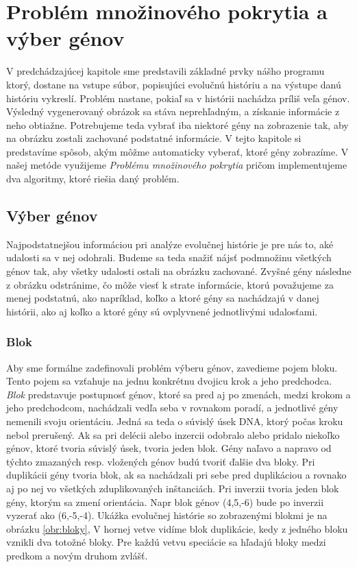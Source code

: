 \chapter{Problém množinového pokrytia a výber génov}
\label{chap:setcover}
V predchádzajúcej kapitole sme predstavili základné prvky nášho programu ktorý, dostane na vstupe súbor, 
popisujúci evolučnú históriu a na výstupe danú históriu vykreslí.
Problém nastane, pokiaľ sa v histórii nachádza príliš veľa génov. Výsledný vygenerovaný obrázok sa stáva neprehľadným, 
a získanie informácie z neho obtiažne. 
Potrebujeme teda vybrať iba niektoré gény na zobrazenie tak, aby na obrázku zostali zachované podstatné informácie.
V tejto kapitole si predstavíme spôsob, akým môžme automaticky vyberať, ktoré gény zobrazíme.
V našej metóde využijeme \emph{Problému množinového pokrytia} pričom implementujeme dva algoritmy, ktoré riešia daný problém.
\section{Výber génov}
Najpodstatnejšou informáciou pri analýze evolučnej histórie je pre nás to, aké udalosti sa v nej odohrali. 
Budeme sa teda snažiť nájsť podmnožinu všetkých génov tak, aby všetky udalosti ostali na obrázku zachované.
Zvyšné gény následne z obrázku odstránime, čo môže viesť k strate informácie, ktorú považujeme za menej podstatnú, 
ako napríklad, koľko a ktoré gény sa nachádzajú v danej histórii, ako aj koľko a ktoré gény sú ovplyvnené jednotlivými udalosťami.
\subsection{Blok}\label{blok}
Aby sme formálne zadefinovali problém výberu génov, zavedieme pojem bloku. Tento pojem sa vzťahuje na jednu konkrétnu dvojicu krok a jeho predchodca.
\emph{Blok} predstavuje postupnosť génov, ktoré sa pred aj po zmenách, medzi krokom a jeho predchodcom, nachádzali vedľa seba v rovnakom poradí, a jednotlivé gény nemenili
svoju orientáciu. Jedná sa teda o súvislý
úsek DNA, ktorý počas kroku nebol prerušený.
Ak sa pri delécii alebo inzercii odobralo alebo pridalo niekoľko génov, ktoré tvoria súvislý úsek, tvoria jeden blok. 
Gény naľavo a napravo od týchto zmazaných resp. vložených génov budú tvoriť ďalšie dva bloky.
Pri duplikácii gény tvoria blok, ak sa nachádzali pri sebe pred duplikáciou a rovnako aj po nej vo všetkých zduplikovaných inštanciách.
Pri inverzii tvoria jeden blok gény, ktorým sa zmení orientácia. Napr blok génov (4,5,-6) bude po inverzii vyzerať ako (6,-5,-4).
Ukážka evolučnej histórie so zobrazenými blokmi je na obrázku \ref{obr:bloky},
V hornej vetve vidíme blok duplikácie, kedy z jedného bloku vznikli dva totožné bloky.
Pre každú vetvu speciácie sa hľadajú bloky medzi predkom a novým druhom zvlášť.

